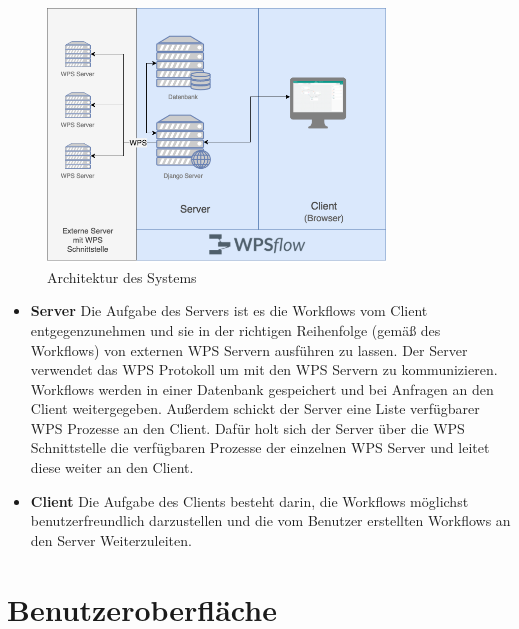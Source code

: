     \begin{figure}[h]
    \centering
    \includegraphics[width=0.8\textwidth]{images/architecture.png}
    \caption{Architektur des Systems}
    \label{fig:Arch}
    \end{figure}
    
    \begin{itemize}
    \item \textbf{Server} \newline 
    Die Aufgabe des Servers ist es die Workflows vom Client entgegenzunehmen und sie in der richtigen Reihenfolge (gemäß des Workflows) von externen WPS Servern ausführen zu lassen. Der Server verwendet das WPS Protokoll um mit den WPS Servern zu kommunizieren.
    Workflows werden in einer Datenbank gespeichert und bei Anfragen an den Client weitergegeben.\newline
    Außerdem schickt der Server eine Liste verfügbarer WPS Prozesse an den Client. Dafür holt sich der Server über die WPS Schnittstelle die verfügbaren Prozesse der einzelnen WPS Server und leitet diese weiter an den Client.\newline
    
    \item \textbf{Client} \newline
    Die Aufgabe des Clients besteht darin, die Workflows möglichst benutzerfreundlich darzustellen und die vom Benutzer erstellten Workflows an den Server Weiterzuleiten.
    
    \end{itemize}

    \section{Benutzeroberfläche}
    
